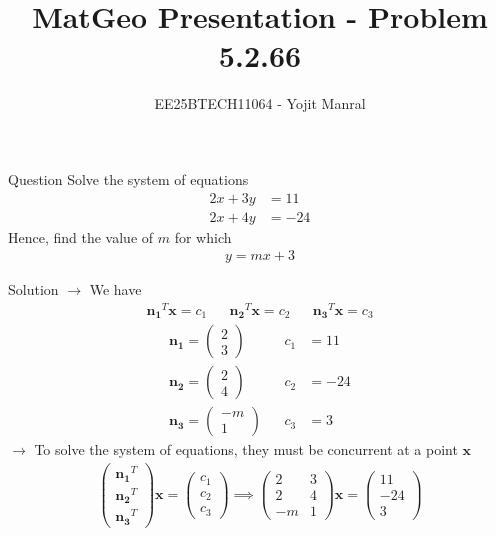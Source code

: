 \documentclass{beamer}
\title{MatGeo Presentation - Problem 5.2.66}
\author{EE25BTECH11064 - Yojit Manral}
\date{}
\numberwithin{equation}{section}
\theoremstyle{remark}
\newcommand{\myvec}[1]{\ensuremath{\begin{pmatrix}#1\end{pmatrix}}}
\let\vec\mathbf
\begin{document}
\frame{\titlepage}
\begin{frame}{Question}
Solve the system of equations
\begin{align}
    2x + 3y &= 11 \\
    2x + 4y &= -24
\end{align}
Hence, find the value of $m$ for which
\begin{align}
    y = mx + 3
\end{align}
\end{frame}

\begin{frame}{Solution}
$\rightarrow$ We have
\begin{align*} \vec{n_1}^T\vec{x} = c_1 && \vec{n_2}^T\vec{x} = c_2 && \vec{n_3}^T\vec{x} = c_3 \end{align*}
\begin{align}
    \vec{n_1} = \myvec{2\\3} && c_1 &= 11 \\
    \vec{n_2} = \myvec{2\\4} && c_2 &= -24 \\
    \vec{n_3} = \myvec{-m\\1} && c_3 &= 3
\end{align}
$\rightarrow$ To solve the system of equations, they must be concurrent at a point $\vec{x}$
\begin{align}
    \myvec{\vec{n_1}^T\\\vec{n_2}^T\\\vec{n_3}^T}\vec{x} = \myvec{c_1\\c_2\\c_3} \implies \myvec{2&3\\2&4\\-m&1}\vec{x} = \myvec{11\\-24\\3}
\end{align}
\end{frame}
\end{document}
